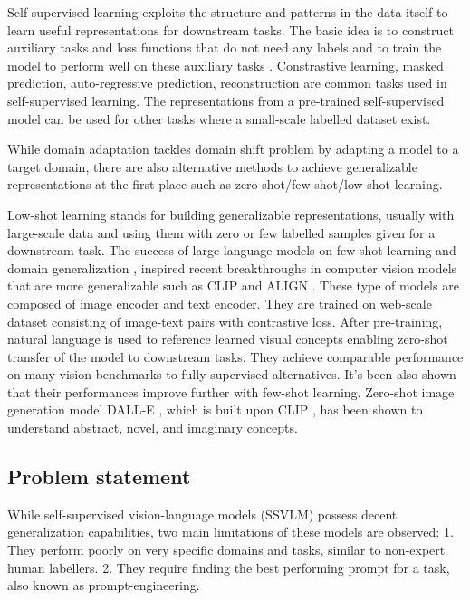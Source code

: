 \documentclass[conference]{IEEEtran}
\begin{document}
Self-supervised learning exploits the structure and patterns in the data itself to learn useful representations for downstream tasks. The basic idea is to construct auxiliary tasks and loss functions that do not need any labels and to train the model to perform well on these auxiliary tasks \cite{Zhao2022}. Constrastive learning, masked prediction, auto-regressive prediction, reconstruction are common tasks used in self-supervised learning. The representations from a pre-trained self-supervised model can be used for other tasks where a small-scale labelled dataset exist. 

While domain adaptation tackles domain shift problem by adapting a model to a target domain, there are also alternative methods to achieve generalizable representations at the first place such as zero-shot/few-shot/low-shot learning. 

Low-shot learning stands for building generalizable representations, usually with large-scale data and using them with zero or few labelled samples given for a downstream task. The success of large language models on few shot learning and domain generalization \cite{bert}, \cite{brown2020language} inspired recent breakthroughs in computer vision models that are more generalizable such as CLIP \cite{clip} and ALIGN \cite{align}. These type of models are composed of image encoder and text encoder. They are trained on web-scale dataset consisting of image-text pairs with contrastive loss. After pre-training, natural language is used to reference learned visual concepts enabling zero-shot transfer of the model to downstream tasks. They achieve comparable performance on many vision benchmarks to fully supervised alternatives. It's been also shown that their performances improve further with few-shot learning. Zero-shot image generation model DALL-E \cite{dalle}, which is built upon CLIP \cite{clip}, has been shown to understand abstract, novel, and imaginary concepts. 


\subsection{Problem statement}

While self-supervised vision-language models (SSVLM) possess decent generalization capabilities, two main limitations of these models are observed:
1. They perform poorly on very specific domains and tasks, similar to non-expert human labellers. 
2. They require finding the best performing prompt for a task, also known as prompt-engineering.
\end{document}
